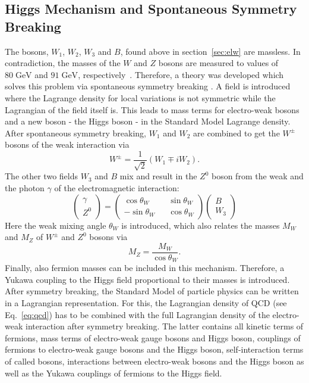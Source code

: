 	\subsection{Higgs Mechanism and Spontaneous Symmetry Breaking}
	\label{sec:higgs}
	The bosons, $W_1$, $W_2$, $W_3$ and $B$, found above in section~\ref{sec:elw} are massless. In contradiction, the masses of the $W$ and $Z$ bosons are measured to values of $80\;\text{GeV}$ and $91\;\text{GeV}$, respectively~\cite{pdg2016}. Therefore, a theory was developed which solves this problem via spontaneous symmetry breaking \cite{Englert, Higgs}. A field is introduced where the Lagrange density for local variations is not symmetric while the Lagrangian of the field itself is. This leads to mass terms for electro-weak bosons and a new boson - the Higgs boson - in the Standard Model Lagrange density. After spontaneous symmetry breaking, $W_1$ and $W_2$ are combined to get the $W^\pm$ bosons of the weak interaction via
	\begin{equation}
	W^\pm = \frac{1}{\sqrt{2}}(W_1 \mp i W_2).
	\label{eq:W}
	\end{equation}
	The other two fields $W_3$ and $B$ mix and result in the $Z^0$ boson from the weak and the photon $\gamma$ of the electromagnetic interaction:
	\begin{equation}
	\begin{pmatrix}\gamma \\ Z^0\end{pmatrix} =
	\begin{pmatrix}
	\cos \theta_W && \sin \theta_W \\
	-\sin \theta_W && \cos \theta_W 
	\end{pmatrix}
	\begin{pmatrix}B \\ W_3\end{pmatrix}
	\label{eq:Z}
	\end{equation}	
	Here the weak mixing angle $\theta_W$ is introduced, which also relates the masses $M_W$ and $M_Z$ of $W^\pm$ and $Z^0$ bosons via
	\begin{equation}
	M_Z = \frac{M_W}{\cos \theta_W}.
	\end{equation}
	Finally, also fermion masses can be included in this mechanism. Therefore, a Yukawa coupling to the Higgs field proportional to their masses is introduced. After symmetry breaking, the Standard Model of particle physics can be written in a Lagrangian representation. For this, the Lagrangian density of QCD (see Eq.~\ref{eq:qcd}) has to be combined with the full Lagrangian density of the electro-weak interaction after symmetry breaking. The latter contains all kinetic terms of fermions, mass terms of electro-weak gauge bosons and Higgs boson, couplings of fermions to electro-weak gauge bosons and the Higgs boson, self-interaction terms of called bosons, interactions between electro-weak bosons and the Higgs boson as well as the Yukawa couplings of fermions to the Higgs field.


